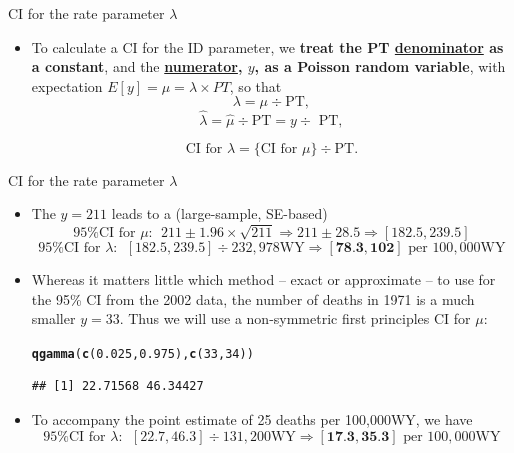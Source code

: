 \documentclass{beamer}\usepackage[]{graphicx}\usepackage[]{color}
\newcommand{\hlnum}[1]{\textcolor[rgb]{0.686,0.059,0.569}{#1}}%
\newcommand{\hlstd}[1]{\textcolor[rgb]{0.345,0.345,0.345}{#1}}%
\newcommand{\hlkwd}[1]{\textcolor[rgb]{0.737,0.353,0.396}{\textbf{#1}}}%
\newenvironment{knitrout}{}{} %
\begin{document}
\begin{frame}{CI for the rate  parameter $\lambda$}

\begin{itemize}
	\item To calculate a CI for the ID parameter, we \textbf{treat the PT \underline{denominator} as a constant}, and the \textbf{\underline{numerator}, $y$,  as a Poisson random variable}, with expectation $E[y] = \mu = \lambda \times PT$, so that
$$\lambda = \mu \div \textrm{PT},$$
$$\hat{\lambda} = \hat{\mu} \div \textrm{PT} = y\div\textrm{ PT},$$

\vspace*{0.3in}
\begin{equation}
\boxed{\textrm{CI for }\lambda = \{\textrm{CI for }\mu\} \div \textrm{PT}.}
\end{equation}


\end{itemize}
\end{frame}


\begin{frame}[fragile]{CI for the rate  parameter $\lambda$}


\begin{itemize}

	\small
	\item The $y=211$ leads to a (large-sample, SE-based) 
	$$\textrm{95\% CI  for }\mu: \: \: 211 \pm 1.96 \times \sqrt{211} \Rightarrow 211 \pm 28.5
	\Rightarrow [182.5, 239.5]$$ 
	$$\textrm{95\% CI  for }\lambda: \: \:  [182.5, 239.5] \div 232,978\textrm{WY}
	\Rightarrow [\textbf{78.3}, \textbf{102}]\textrm{ per }100,000\textrm{WY}$$ 
	
	\pause 
	
\item Whereas it matters little which method -- exact or approximate -- to use for the 95\% CI from the 2002 data, the number of deaths in 1971 is a much smaller $y=33.$ Thus we will use a non-symmetric first principles CI for $\mu$: 

\begin{knitrout}\scriptsize
{}\color{fgcolor}
\begin{alltt}
\hlkwd{qgamma}\hlstd{(}\hlkwd{c}\hlstd{(}\hlnum{0.025}\hlstd{,}\hlnum{0.975}\hlstd{),} \hlkwd{c}\hlstd{(}\hlnum{33}\hlstd{,}\hlnum{34}\hlstd{))}
\end{alltt}
\begin{verbatim}
## [1] 22.71568 46.34427
\end{verbatim}

\end{knitrout}

\pause 

\item 

To accompany the point estimate of 25 deaths per 100,000WY, we have  
	$$\textrm{95\% CI  for }\lambda: \: \:  [22.7, 46.3] \div 131,200\textrm{WY}
	\Rightarrow [\textbf{17.3}, \textbf{35.3}]\textrm{ per }100,000\textrm{WY}$$ 

\end{itemize}

\end{frame}
\end{document}
